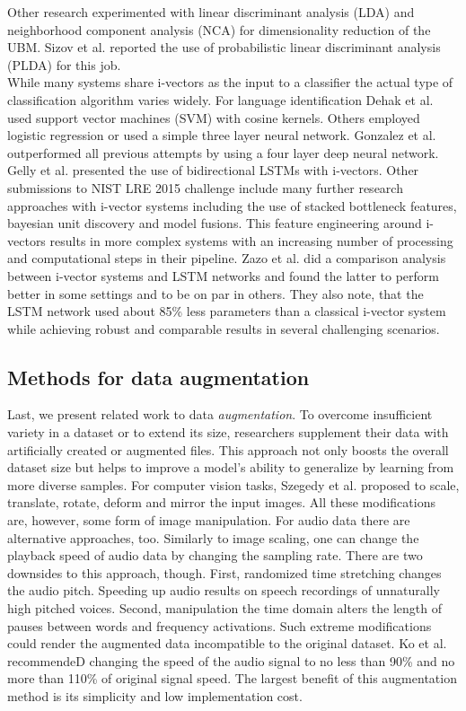 Other research experimented with linear discriminant analysis (LDA) and neighborhood component analysis (NCA) for dimensionality reduction of the UBM.\cite{dehak2011front} Sizov et al. reported the use of probabilistic linear discriminant analysis (PLDA) for this job.\cite{sizov2016discriminating}\\
While many systems share i-vectors as the input to a classifier the actual type of classification algorithm varies widely. For language identification Dehak et al. used support vector machines (SVM) with cosine kernels.\cite{dehak2011front} Others employed logistic regression\cite{martinez2011language} or used a simple three layer neural network\cite{plchot2016bat}. Gonzalez et al. outperformed all previous attempts by using a four layer deep neural network.\cite{gonzalez2015frame} Gelly et al. presented the use of bidirectional LSTMs with i-vectors.\cite{gelly2016language} Other submissions to NIST LRE 2015 challenge\cite{lre2015} include many further research approaches with i-vector systems including the use of stacked bottleneck features, bayesian unit discovery and model fusions.\cite{lee20162015, torres2008mitll, ng2016sheffield} This feature engineering around i-vectors results in more complex systems with an increasing number of processing and computational steps in their pipeline. Zazo et al. did a comparison analysis between i-vector systems and LSTM networks and found the latter to perform better in some settings and to be on par in others.\cite{zazo2016evaluation} They also note, that the LSTM network used about 85\% less parameters than a classical i-vector system while achieving robust and comparable results in several challenging scenarios.

\subsection{Methods for data augmentation}
Last, we present related work to data \emph{augmentation}. To overcome insufficient variety in a dataset or to extend its size, researchers supplement their data with artificially created or augmented files. This approach not only boosts the overall dataset size but helps to improve a model's ability to generalize by learning from more diverse samples. For computer vision tasks, Szegedy et al. proposed to scale, translate, rotate, deform and mirror the input images.\cite{szegedy2015going} All these modifications are, however, some form of image manipulation. For audio data there are alternative approaches, too. Similarly to image scaling, one can change the playback speed of audio data by changing the sampling rate. There are two downsides to this approach, though. First, randomized time stretching changes the audio pitch. Speeding up audio results on speech recordings of unnaturally high pitched voices. Second, manipulation the time domain alters the length of pauses between words and frequency activations. Such extreme modifications could render the augmented data incompatible to the original dataset. Ko et al. recommendeD changing the speed of the audio signal to no less than 90\% and no more than 110\% of original signal speed.\cite{ko2015audio} The largest benefit of this augmentation method is its simplicity and low implementation cost.

